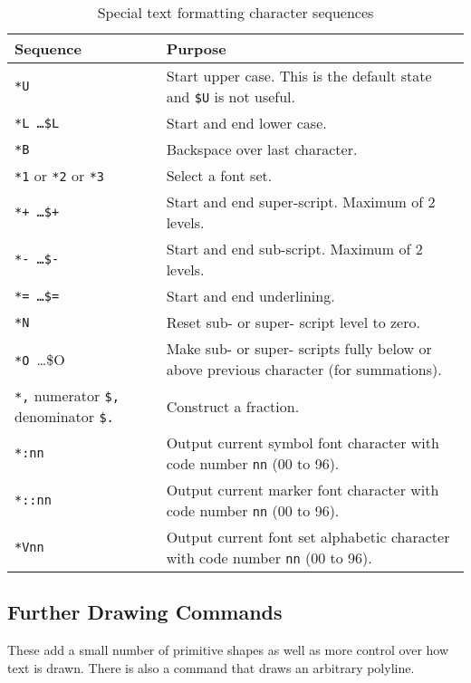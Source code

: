 \documentclass[a4paper,twoside,11pt]{article}
\begin{document}
\begin{table}
\begin{footnotesize}
\centering
\begin{tabular}{|| l | l ||}
\hline
Sequence & Purpose \\
\hline
\texttt{*U} & Start upper case. This is the default state and \texttt{\$U} is not useful.\\
\texttt{*L  \ldots \$L} & Start and end lower case.\\
\texttt{*B} & Backspace over last character.\\
\texttt{*1} or \texttt{*2} or \texttt{*3} & Select a font set.\\
\texttt{*+  \ldots \$+ } & Start and end super-script. Maximum of 2 levels.\\
\texttt{*- \ldots \$-} & Start and end sub-script. Maximum of 2 levels.\\
\texttt{*= \ldots \$=} & Start and end underlining.\\
\texttt{*N} & Reset sub- or super- script level to zero.\\
\texttt{*O }\ldots \$O & Make sub- or super- scripts fully below or above previous character (for summations).\\
\texttt{*,} numerator \texttt{\$,} denominator \texttt{\$.} & Construct a fraction.\\
\texttt{*:nn} & Output current symbol font character with code number \texttt{nn} (00 to 96).\\
\texttt{*::nn} & Output current marker font character with code number \texttt{nn} (00 to 96).\\
\texttt{*Vnn }& Output current font set alphabetic character with code number \texttt{nn} (00 to 96).\\
\hline
\end{tabular}
\caption{Special text formatting character sequences}
\label{tab:textformats}
\end{footnotesize}
\end{table}

\subsection{Further Drawing Commands}
These add a small number of primitive shapes as well as more control over how text is drawn.
There is also a command that draws an arbitrary polyline.
\end{document}
